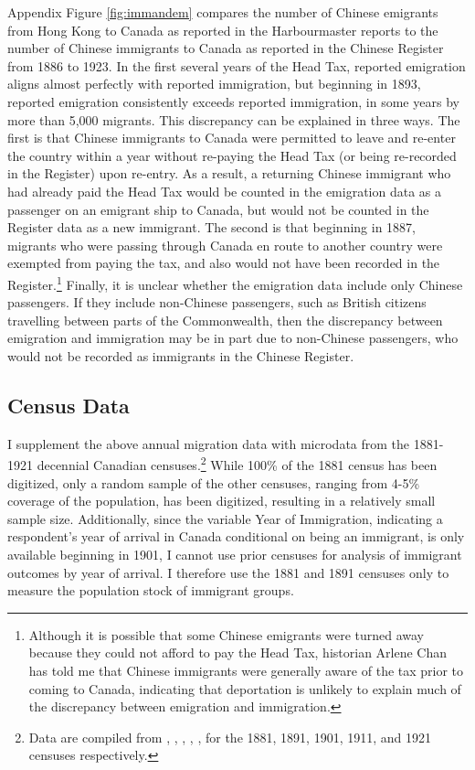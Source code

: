 Appendix Figure \ref{fig:immandem} compares the number of Chinese emigrants from Hong Kong to Canada as reported in the Harbourmaster reports to the number of Chinese immigrants to Canada as reported in the Chinese Register from 1886 to 1923. In the first several years of the Head Tax, reported emigration aligns almost perfectly with reported immigration, but beginning in 1893, reported emigration consistently exceeds reported immigration, in some years by more than 5,000 migrants. 
This discrepancy can be explained in three ways. 
The first is that Chinese immigrants to Canada were permitted to leave and re-enter the country within a year without re-paying the Head Tax (or being re-recorded in the Register) upon re-entry. As a result, a returning Chinese immigrant who had already paid the Head Tax would be counted in the emigration data as a passenger on an emigrant ship to Canada, but would not be counted in the Register data as a new immigrant. 
The second is that beginning in 1887, migrants who were passing through Canada en route to another country were exempted from paying the tax, and also would not have been recorded in the Register.\footnote{Although it is possible that some Chinese emigrants were turned away because they could not afford to pay the Head Tax, historian Arlene Chan has told me that Chinese immigrants were generally aware of the tax prior to coming to Canada, indicating that deportation is unlikely to explain much of the discrepancy between emigration and immigration.}
Finally, it is unclear whether the emigration data include only Chinese passengers. If they include non-Chinese passengers, such as British citizens travelling between parts of the Commonwealth, then the discrepancy between emigration and immigration may be in part due to non-Chinese passengers, who would not be recorded as immigrants in the Chinese Register.

\subsection{Census Data}
I supplement the above annual migration data with microdata from the 1881-1921 decennial Canadian censuses.\footnote{Data are compiled from \citet{census1881}, \citet{census1891}, \citet{census1901}, \citet{census1911}, \citet{census1921}, for the 1881, 1891, 1901, 1911, and 1921 censuses respectively.} While 100\% of the 1881 census has been digitized, only a random sample of the other censuses, ranging from 4-5\% coverage of the population, has been digitized, resulting in a relatively small sample size. Additionally, since the variable Year of Immigration, indicating a respondent's year of arrival in Canada conditional on being an immigrant, is only available beginning in 1901, I cannot use prior censuses for analysis of immigrant outcomes by year of arrival. I therefore use the 1881 and 1891 censuses only to measure the population stock of immigrant groups.

